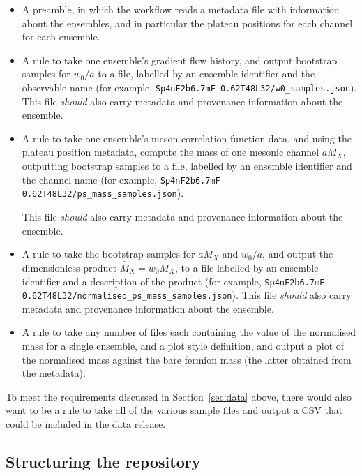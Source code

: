 \documentclass{article}
\newcommand\rfcword[1]{\emph{#1}\xspace}
\newcommand\should{\rfcword{should}}
\begin{document}
\begin{itemize}
  \item
        A preamble,
        in which the workflow reads a metadata file with information about the ensembles,
        and in particular the plateau positions for each channel for each ensemble.
  \item
        A rule to take one ensemble's gradient flow history,
        and output bootstrap samples for $w_{0}/a$ to a file,
        labelled by an ensemble identifier and the observable name
        (for example,
        \texttt{Sp4nF2b6.7mF-0.62T48L32/\hspace{0pt}w0\_samples.json}).
        This file \should also carry
        metadata and provenance information about the ensemble.
  \item
        A rule to take one ensemble's meson correlation function data,
        and using the plateau position metadata,
        compute the mass of one mesonic channel $aM_{X}$,
        outputting bootstrap samples to a file,
        labelled by an ensemble identifier and the channel name
        (for example,
        \texttt{Sp4nF2b6.7mF-0.62T48L32/\hspace{0pt}ps\_mass\_samples.json}).

        This file \should also carry
        metadata and provenance information about the ensemble.
  \item
        A rule to take the bootstrap samples for $aM_{X}$ and $w_{0}/a$,
        and output the dimensionless product $\hat{M}_{X}=w_{0}M_{X}$,
        to a file labelled by an ensemble identifier and a description of the product
        (for example,
        \texttt{Sp4nF2b6.7mF-0.62T48L32/\hspace{0pt}normalised\_ps\_mass\_samples.json}).
        This file \should also carry
        metadata and provenance information about the ensemble.
  \item
        A rule to take any number of files
        each containing the value of the normalised mass for a single ensemble,
        and a plot style definition,
        and output a plot of the normalised mass against the bare fermion mass
        (the latter obtained from the metadata).
\end{itemize}

To meet the requirements discussed in Section~\ref{sec:data} above,
there would also want to be a rule to take all of the various sample files
and output a CSV that could be included in the data release.

\subsection{Structuring the repository}\label{sec:repository-structure}
\end{document}
